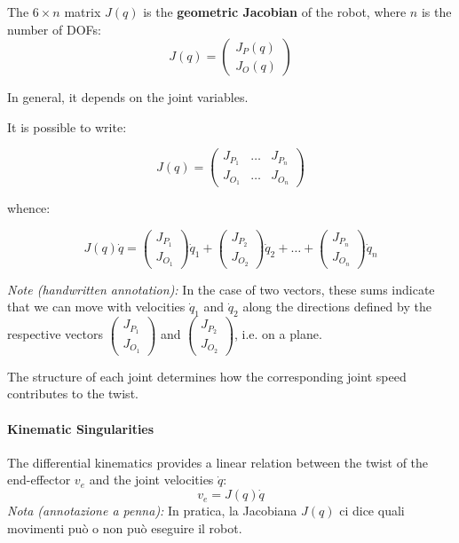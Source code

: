 The $6 \times n$ matrix $J(q)$ is the \textbf{geometric Jacobian} of the robot, where $n$ is the number of DOFs:
  \[
  J(q) = 
  \begin{pmatrix}
  J_P(q) \\
  J_O(q)
  \end{pmatrix}
  \]

In general, it depends on the joint variables.
  
It is possible to write:

\[
  J(q) =
  \begin{pmatrix}
  J_{P_1} & \dots & J_{P_n} \\
  J_{O_1} & \dots & J_{O_n}
  \end{pmatrix}
\]

whence:

\[
  J(q) \dot{q} =
  \begin{pmatrix}
  J_{P_1} \\
  J_{O_1}
  \end{pmatrix} \dot{q}_1 +
  \begin{pmatrix}
  J_{P_2} \\
  J_{O_2}
  \end{pmatrix} \dot{q}_2 + \dots +
  \begin{pmatrix}
  J_{P_n} \\
  J_{O_n}
  \end{pmatrix} \dot{q}_n
\]
  
\textit{Note (handwritten annotation):} In the case of two vectors, these sums indicate that we can move with velocities $\dot{q}_1$ and $\dot{q}_2$ along the directions defined by the respective vectors $\begin{pmatrix} J_{P_1} \\ J_{O_1} \end{pmatrix}$ and $\begin{pmatrix} J_{P_2} \\ J_{O_2} \end{pmatrix}$, i.e. on a plane.

The structure of each joint determines how the corresponding joint speed contributes to the twist.

\hfill

\paragraph{Kinematic Singularities} \hfill

The differential kinematics provides a linear relation between the twist of the end-effector $v_e$ and the joint velocities $\dot{q}$:
\[
v_e = J(q) \dot{q}
\]
\textit{Nota (annotazione a penna):} In pratica, la Jacobiana $J(q)$ ci dice quali movimenti può o non può eseguire il robot.

